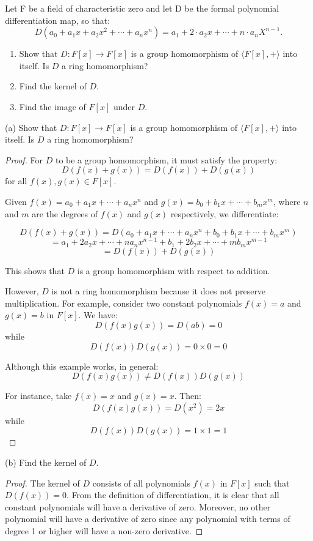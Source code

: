 \documentclass[12pt]{amsart}
\theoremstyle{definition}
\numberwithin{equation}{section}
\theoremstyle{plain}
\begin{document}
\vspace*{20pt}
\begin{exercise}{27} Let F be a field of characteristic zero and let D be the formal polynomial differentiation map, so that:
    \[D(a_0+a_1x+a_2x^2+\cdots+a_nx^n) = a_1 + 2 \cdot a_2x + \cdots +n \cdot a_nX^{n-1}.\]

    \begin{enumerate}[label=(\alph*.)]
        \item Show that $D : F[x] \rightarrow F[x]$ is a group homomorphism of $\langle F[x], +\rangle$ into itself. Is $D$ a ring homomorphism?
        \item Find the kernel of $D$.
        \item Find the image of $F[x]$ under $D$.
    \end{enumerate}

    
(a) Show that \( D : F[x] \rightarrow F[x] \) is a group homomorphism of \( \langle F[x], +\rangle \) into itself. Is \( D \) a ring homomorphism?

\begin{proof}
For \( D \) to be a group homomorphism, it must satisfy the property:
\[ D(f(x) + g(x)) = D(f(x)) + D(g(x)) \]
for all \( f(x), g(x) \in F[x] \).

Given \( f(x) = a_0 + a_1x + \cdots + a_nx^n \) and \( g(x) = b_0 + b_1x + \cdots + b_mx^m \), where \( n \) and \( m \) are the degrees of \( f(x) \) and \( g(x) \) respectively, we differentiate:

\[ D(f(x) + g(x)) = D(a_0 + a_1x + \cdots + a_nx^n + b_0 + b_1x + \cdots + b_mx^m) \]
\[ = a_1 + 2a_2x + \cdots + na_nx^{n-1} + b_1 + 2b_2x + \cdots + mb_mx^{m-1} \]
\[ = D(f(x)) + D(g(x)) \]

This shows that \( D \) is a group homomorphism with respect to addition.

However, \( D \) is not a ring homomorphism because it does not preserve multiplication. For example, consider two constant polynomials \( f(x) = a \) and \( g(x) = b \) in \( F[x] \). We have:
\[ D(f(x)g(x)) = D(ab) = 0 \]
while
\[ D(f(x))D(g(x)) = 0 \times 0 = 0 \]

Although this example works, in general:
\[ D(f(x)g(x)) \neq D(f(x))D(g(x)) \]

For instance, take \( f(x) = x \) and \( g(x) = x \). Then:
\[ D(f(x)g(x)) = D(x^2) = 2x \]
while
\[ D(f(x))D(g(x)) = 1 \times 1 = 1 \]
\end{proof}
(b) Find the kernel of \( D \).

\begin{proof}
The kernel of \( D \) consists of all polynomials \( f(x) \) in \( F[x] \) such that \( D(f(x)) = 0 \). From the definition of differentiation, it is clear that all constant polynomials will have a derivative of zero. Moreover, no other polynomial will have a derivative of zero since any polynomial with terms of degree 1 or higher will have a non-zero derivative. 


\end{proof}
\end{exercise}
\end{document}
